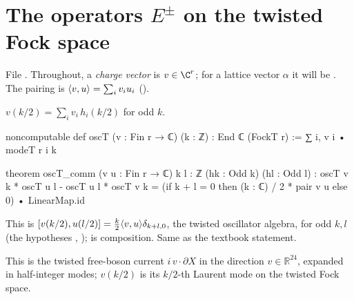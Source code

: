 \section{The operators \texorpdfstring{$E^\pm$}{E plus-minus} on the twisted Fock space}\label{ch08:sec:Epm}

File .  Throughout, a \emph{charge vector} is
$v\in\C^r$; for a lattice vector $\alpha$ it will be .  The pairing is
$\langle v,u\rangle=\sum_iv_iu_i$ ().

\begin{definition}\label{ch08:def:oscT}
$v(k/2)=\sum_iv_i\,h_i(k/2)$ for odd $k$.
\end{definition}
\begin{leancode}
noncomputable def oscT (v : Fin r → ℂ) (k : ℤ) : End ℂ (FockT r) := ∑ i, v i • modeT r i k

theorem oscT_comm (v u : Fin r → ℂ) {k l : ℤ} (hk : Odd k) (hl : Odd l) :
    oscT v k * oscT u l - oscT u l * oscT v k
      = (if k + l = 0 then (k : ℂ) / 2 * pair v u else 0) • LinearMap.id
\end{leancode}
\begin{dictionary}
This is $[v(k/2),u(l/2)]=\frac k2\langle v,u\rangle\delta_{k+l,0}$, the twisted oscillator algebra,
for odd $k,l$ (the hypotheses , ); \lean{*} is composition.  Same as the textbook
statement.
\end{dictionary}

\begin{physics}
This is the twisted free-boson current $i\,v\!\cdot\!\partial X$ in the direction $v\in\mathbb R^{24}$, expanded in half-integer modes; $v(k/2)$ is its $k/2$-th Laurent mode on the twisted Fock space.
\end{physics}

